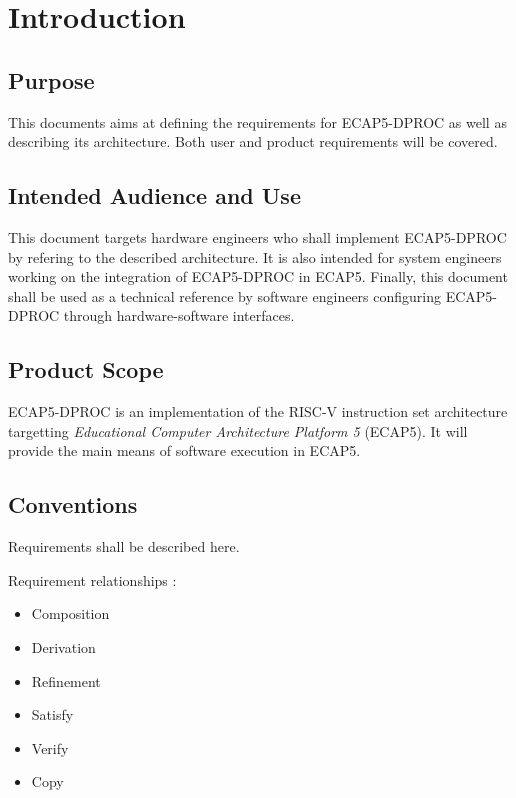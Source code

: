 \section{Introduction}
  \subsection{Purpose}

    \begin{content}
        This documents aims at defining the requirements for ECAP5-DPROC as well as describing its architecture. Both user and product requirements will be covered.
      \end{content}

  \subsection{Intended Audience and Use}

    \begin{content}
        This document targets hardware engineers who shall implement ECAP5-DPROC by refering to the described architecture. It is also intended for system engineers working on the integration of ECAP5-DPROC in ECAP5. Finally, this document shall be used as a technical reference by software engineers configuring ECAP5-DPROC through hardware-software interfaces.
      \end{content}

  \subsection{Product Scope}

    \begin{content}
        ECAP5-DPROC is an implementation of the RISC-V instruction set architecture targetting \textit{Educational Computer Architecture Platform 5} (ECAP5). It will provide the main means of software execution in ECAP5.
      \end{content}

  \subsection{Conventions}

    Requirements shall be described here.

    Requirement relationships :
    \begin{itemize}
        \item Composition
        \item Derivation
        \item Refinement
        \item Satisfy
        \item Verify
        \item Copy
      \end{itemize}

